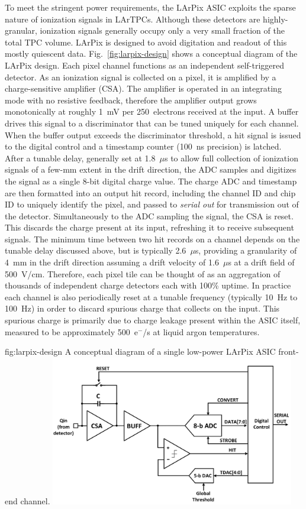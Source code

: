 To meet the stringent power requirements, the LArPix ASIC exploits the sparse nature of ionization signals in LArTPCs\@.
Although these detectors are highly-granular, ionization signals generally occupy only a very small fraction of the total TPC volume.
LArPix is designed to avoid digitation and readout of this mostly quiescent data.
Fig.~\ref{fig:larpix-design} shows a conceptual diagram of the LArPix design.
Each pixel channel functions as an independent self-triggered detector.
As an ionization signal is collected on a pixel, it is amplified by a charge-sensitive amplifier (CSA)\@.
The amplifier is operated in an integrating mode with no resistive feedback, therefore the amplifier output grows monotonically at roughly 1~mV per 250~electrons received at the input.
A buffer drives this signal to a discriminator that can be tuned uniquely for each channel.
When the buffer output exceeds the discriminator threshold, a hit signal is issued to the digital control and a timestamp counter (100~ns precision) is latched.
After a tunable delay, generally set at 1.8~$\mu$s to allow full collection of ionization signals of a few-mm extent in the drift direction, the ADC samples and digitizes the signal as a single 8-bit digital charge value.
The charge ADC and timestamp are then formatted into an output hit record, including the channel ID and chip ID to uniquely identify the pixel, and passed to {\em serial out} for transmission out of the detector.
Simultaneously to the ADC sampling the signal, the CSA is reset.
This discards the charge present at its input, refreshing it to receive subsequent signals.
The minimum time between two hit records on a channel depends on the tunable delay discussed above, but is typically 2.6~$\mu$s, providing a granularity of 4~mm in the drift direction assuming a drift velocity of 1.6~$\mu$s at a drift field of 500~V/cm\@.
Therefore, each pixel tile can be thought of as an aggregation of thousands of independent charge detectors each with 100\% uptime.
In practice each channel is also periodically reset at a tunable frequency (typically 10~Hz to 100~Hz) in order to discard spurious charge that collects on the input. This spurious charge is primarily due to charge leakage present within the ASIC itself, measured to be approximately 500~e$^-$/s at liquid argon temperatures.

\begin{dunefigure}{fig:larpix-design}
{A conceptual diagram of a single low-power LArPix ASIC front-end channel.}
\includegraphics[width=0.8\textwidth]{graphics/lartpc/Charge/larpix_frontend.png}
\end{dunefigure}

